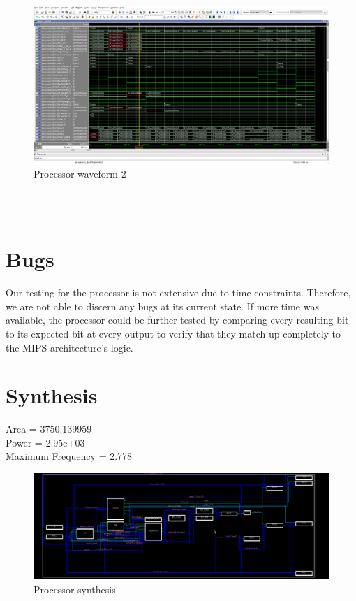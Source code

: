 \documentclass{article}
\begin{document}
\\ \\
\begin{figure}[!ht]
	\centering
		\includegraphics[width=1\textwidth]{processor_waveform2.png}
		\caption{Processor waveform 2}
\end{figure}
\\ \\
 
\section{Bugs}
Our testing for the processor is not extensive due to time constraints. Therefore, we are not able to discern any bugs at its current state. If more time was available, the processor could be further tested by comparing every resulting bit to its expected bit at every output to verify that they match up completely to the MIPS architecture's logic.

\section{Synthesis}
Area = 3750.139959\\
Power = 2.95e+03\\
Maximum Frequency = 2.778\\

\begin{figure}[!ht]
	\centering
		\includegraphics[width=1\textwidth]{processor_schematic.png}
		\caption{Processor synthesis}
\end{figure}
\\ \\
\end{document}
